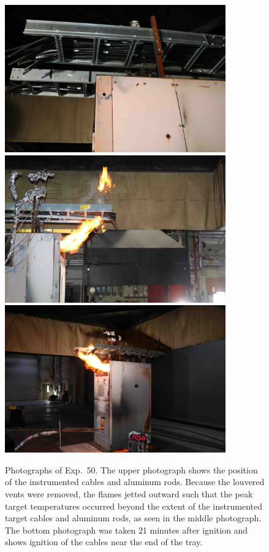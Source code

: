 \begin{figure}[p]
\centering
\includegraphics[height=2.50in]{../FIGURES/Test_50_cables} \\ \vspace{0.1in}
\includegraphics[height=2.50in]{../FIGURES/Test_50_side} \\ \vspace{0.1in}
\includegraphics[height=2.50in]{../FIGURES/Test_50_20_min_58_s}
\caption[Photographs of Exp.~50]{Photographs of Exp.~50. The upper photograph shows the position of the instrumented cables and aluminum rods. Because the louvered vents were removed, the flames jetted outward such that the peak target temperatures occurred beyond the extent of the instrumented target cables and aluminum rods, as seen in the middle photograph. The bottom photograph was taken 21 minutes after ignition and shows ignition of the cables near the end of the tray.}
\label{fig:Test_50_photos}
\end{figure}


